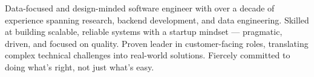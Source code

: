 

\begin{cvparagraph}


Data-focused and design-minded software engineer with over a decade of experience spanning research, 
backend development, and data engineering. 
Skilled at building scalable, reliable systems with a startup mindset — 
pragmatic, driven, and focused on quality. 
Proven leader in customer-facing roles, translating complex technical challenges into real-world solutions. 
Fiercely committed to doing what’s right, not just what’s easy.
\end{cvparagraph}
